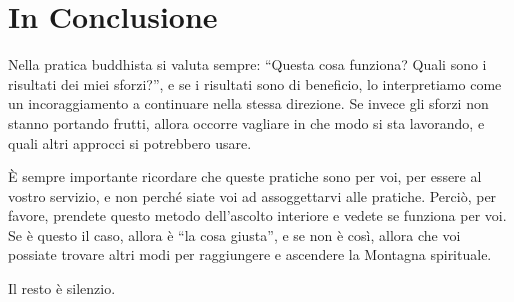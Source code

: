 \chapter{In Conclusione}

Nella pratica buddhista si valuta sempre: ``Questa cosa funziona? Quali
sono i risultati dei miei sforzi?'', e se i risultati sono di beneficio,
lo interpretiamo come un incoraggiamento a continuare nella stessa
direzione. Se invece gli sforzi non stanno portando frutti, allora
occorre vagliare in che modo si sta lavorando, e quali altri approcci si
potrebbero usare.

È sempre importante ricordare che queste pratiche sono per voi, per
essere al vostro servizio, e non perché siate voi ad assoggettarvi alle
pratiche. Perciò, per favore, prendete questo metodo dell'ascolto
interiore e vedete se funziona per voi. Se è questo il caso, allora è
``la cosa giusta'', e se non è così, allora che voi possiate trovare
altri modi per raggiungere e ascendere la Montagna spirituale.

Il resto è silenzio.